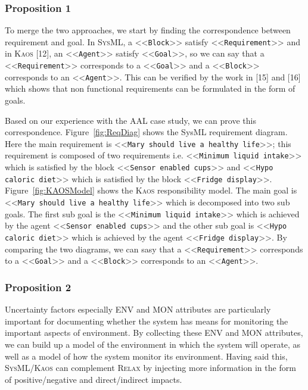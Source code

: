 \documentclass[10pt, conference, compsocconf]{IEEEtran}
\def\myrelax{\textsc{Relax}}                  %
\def\sysml{\textsc{SysML}}
\def\kaos{\textsc{Kaos}}
\newcommand{\Myfig}[1]{Figure~\ref{fig:#1}}
\newcommand{\stereotype}[1]{\textless\textless\texttt{#1}\textgreater\textgreater}
\begin{document}
\subsubsection*{Proposition 1}

To merge the two approaches, we start by finding the correspondence between requirement and goal. In \sysml{}, a \stereotype{Block} satisfy \stereotype{Requirement} and in \kaos{} [12], an \stereotype{Agent} satisfy \stereotype{Goal}, so we can say that a \stereotype{Requirement} corresponds to a \stereotype{Goal} and a \stereotype{Block} corresponds to an \stereotype{Agent}. This can be verified by the work in [15] and [16] which shows that non functional requirements can be formulated in the form of goals. 

Based on our experience with the AAL case study, we can prove this correspondence. \Myfig{ReqDiag} shows the SysML requirement diagram. Here the main requirement is \stereotype{Mary should live a healthy life}; this requirement is composed of two requirements i.e. \stereotype{Minimum liquid intake} which is satisfied by the block \stereotype{Sensor enabled cups} and \stereotype{Hypo caloric diet} which is satisfied by the block \stereotype{Fridge display}. \Myfig{KAOSModel} shows the \kaos{} responsibility model. The main goal is \stereotype{Mary should live a healthy life} which is decomposed into two sub goals. The first sub goal is the \stereotype{Minimum liquid intake} which is achieved by the agent \stereotype{Sensor enabled cups} and the other sub goal is \stereotype{Hypo caloric diet} which is achieved by the agent \stereotype{Fridge display}. By comparing the two diagrams, we can sasy that a \stereotype{Requirement} corresponds to a \stereotype{Goal} and a \stereotype{Block} corresponds to an \stereotype{Agent}.

\subsubsection*{Proposition 2}

Uncertainty factors especially ENV and MON attributes are particularly important for documenting whether the system has means for monitoring the important aspects of environment. By collecting these ENV and MON attributes, we can build up a model of the environment in which the system will operate, as well as a model of how the system monitor its environment. Having said this, \sysml{}/\kaos{} can complement \myrelax{} by injecting more information in the form of positive/negative and direct/indirect impacts. 
\end{document}
